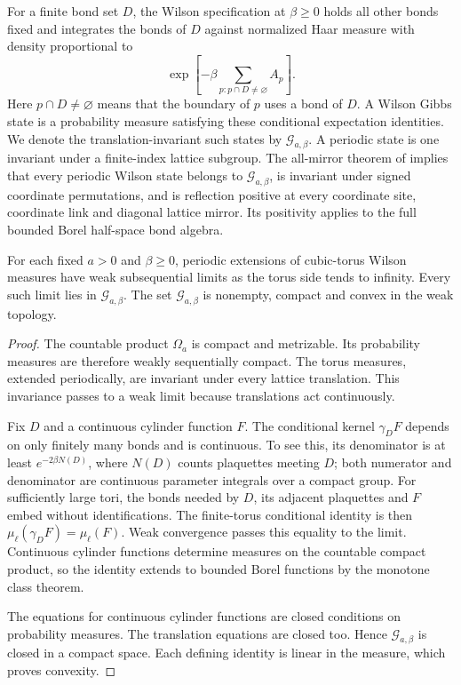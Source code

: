\documentclass[11pt,letterpaper,reqno]{amsart}
\makeatletter
\numberwithin{equation}{section}
\theoremstyle{definition}
\newcommand{\ms@minorstart}{%
  \pushQED{\qed}\renewcommand{\qedsymbol}{$\blacksquare$}}
\newenvironment{proposition}[1][]{\ms@minorstart\ms@proposition[#1]}
  {\popQED\endms@proposition}
\theoremstyle{remark}
\makeatother
\begin{document}
For a finite bond set \(D\), the Wilson specification at
\(\beta\ge0\) holds all other bonds fixed and integrates the
bonds of \(D\) against normalized Haar measure with density
proportional to
\[
             \exp\!\left[-\beta
                \sum_{p:p\cap D\ne\varnothing}A_p\right].
\]
Here \(p\cap D\ne\varnothing\) means that the boundary of \(p\)
uses a bond of \(D\). A Wilson Gibbs state is a probability
measure satisfying these conditional expectation identities.
We denote the translation-invariant such states by
\(\mathcal G_{a,\beta}\). A periodic state is one invariant
under a finite-index lattice subgroup. The all-mirror theorem
of \cite[Theorem~B]{LP} implies that every periodic Wilson state
belongs to \(\mathcal G_{a,\beta}\), is invariant under signed
coordinate permutations, and is reflection positive at every
coordinate site, coordinate link and diagonal lattice mirror.
Its positivity applies to the full bounded Borel half-space
bond algebra.

\begin{proposition}[Fixed-spacing infinite-volume states]
\label{cl:prop-fixed-spacing}
For each fixed \(a>0\) and \(\beta\ge0\), periodic extensions
of cubic-torus Wilson measures have weak subsequential limits
as the torus side tends to infinity. Every such limit lies
in \(\mathcal G_{a,\beta}\). The set \(\mathcal G_{a,\beta}\)
is nonempty, compact and convex in the weak topology.
\end{proposition}
\begin{proof}
The countable product \(\Omega_a\) is compact and metrizable.
Its probability measures are therefore weakly sequentially
compact. The torus measures, extended periodically, are
invariant under every lattice translation. This invariance
passes to a weak limit because translations act continuously.

Fix \(D\) and a continuous cylinder function \(F\).
The conditional kernel \(\gamma_DF\) depends on only finitely
many bonds and is continuous. To see this, its denominator
is at least \(e^{-2\beta N(D)}\), where \(N(D)\) counts
plaquettes meeting \(D\); both numerator and denominator are
continuous parameter integrals over a compact group.
For sufficiently large tori, the bonds needed by \(D\),
its adjacent plaquettes and \(F\) embed without identifications.
The finite-torus conditional identity is then
\(\mu_\ell(\gamma_DF)=\mu_\ell(F)\). Weak convergence passes
this equality to the limit. Continuous cylinder functions
determine measures on the countable compact product, so the
identity extends to bounded Borel functions by the monotone
class theorem.

The equations for continuous cylinder functions are closed
conditions on probability measures. The translation equations
are closed too. Hence \(\mathcal G_{a,\beta}\) is closed
in a compact space. Each defining identity is linear in
the measure, which proves convexity.
\end{proof}
\end{document}
